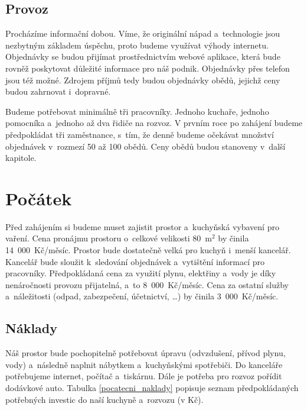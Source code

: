 \subsection{Provoz}
Procházíme informační dobou. Víme, že originální nápad a~technologie jsou nezbytným základem úspěchu, proto budeme využívat výhody internetu. Objednávky se budou při\-jímat prostřednictvím webové aplikace, která bude rovněž poskytovat důležité informace pro náš podnik. Objednávky přes telefon jsou též možné. Zdrojem příjmů tedy budou objednávky obědů, jejichž ceny budou zahrnovat i~dopravné.

Budeme potřebovat minimálně tři pracovníky. Jednoho kuchaře, jednoho pomocníka a~jednoho až dva řidiče na rozvoz. V prvním roce po zahájení budeme předpokládat tři zaměstnance, s~tím, že denně budeme očekávat množství objednávek v~rozmezí 50 až 100 obědů. Ceny obědů budou stanoveny v~další kapitole.





\section{Počátek}
Před zahájením si budeme muset zajistit prostor a~kuchyňská vybavení pro vaření. Cena pronájmu prostoru o~celkové velikosti 80~m$^2$ by činila 14~000~Kč/měsíc. Prostor bude dostatečně velká pro kuchyň i~menší kancelář. Kancelář bude sloužit k~sledování objednávek a~vytištění informací pro pracovníky. Předpokládaná cena za využití plynu, elektřiny a~vody je díky nenáročnosti provozu přijatelná, a~to 8~000~Kč/měsíc. Cena za ostatní služby a~náležitosti (odpad, zabezpečení, účetnictví, \ldots) by činila 3~000~Kč/měsíc.

\subsection{Náklady}
Náš prostor bude pochopitelně potřebovat úpravu (odvzdušení, přívod plynu, vody) a~ná\-sledně naplnit nábytkem a~kuchyňskými spotřebiči. Do kanceláře potřebujeme internet, počítač a~tiskárnu. Dále je potřeba pro rozvoz pořídit dodávkové auto. Tabulka \ref{pocatecni_naklady} popisuje seznam předpokládaných potřebných investic do naší kuchyně a~rozvozu (v Kč).

